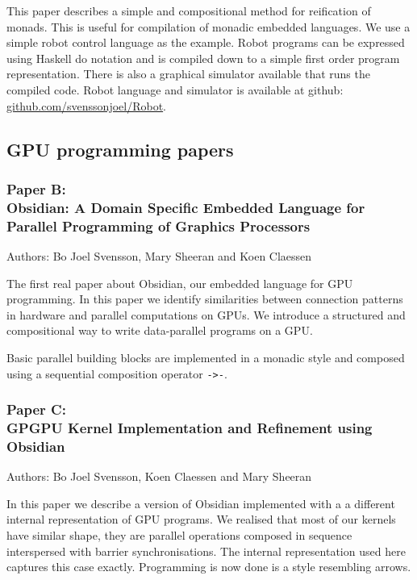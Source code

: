 \documentclass[a4paper]{book}
\newcommand{\paperB}{Paper B}
\newcommand{\paperBTitle}{Obsidian: A Domain Specific Embedded Language for Parallel Programming of Graphics Processors}
\newcommand{\paperC}{Paper C}
\newcommand{\paperCTitle}{GPGPU Kernel Implementation and Refinement using Obsidian}
\begin{document}
\noindent This paper describes a simple and compositional method for 
reification of monads. This is useful for compilation of 
monadic embedded languages. We use a simple robot control language 
as the example. Robot programs can be expressed using Haskell do notation 
and is compiled down to a simple first order program representation. 
There is also a graphical simulator available that runs the compiled 
code. Robot language and simulator is available at github: \url{github.com/svenssonjoel/Robot}.

\subsection{GPU programming papers} 

\subsubsection{\paperB: \\ \paperBTitle}

Authors: Bo Joel Svensson, Mary Sheeran and Koen Claessen \newline

\vspace{5mm}

The first real paper about Obsidian, our embedded language for GPU 
programming. In this paper we identify similarities between 
connection patterns in hardware and parallel computations on GPUs. 
We introduce a structured and compositional way to write data-parallel 
programs on a GPU.

Basic parallel building blocks are implemented in a monadic style and 
composed using a sequential composition operator {\tt ->-}. 

\subsubsection{\paperC: \\ \paperCTitle}

Authors: Bo Joel Svensson, Koen Claessen and Mary Sheeran \newline

\vspace{5mm}

In this paper we describe a version of Obsidian implemented with a 
a different internal representation of GPU programs. We realised that 
most of our kernels have similar shape, they are parallel operations 
composed in sequence interspersed with barrier synchronisations. The 
internal representation used here captures this case exactly. Programming 
is now done is a style resembling arrows. 
\end{document}
